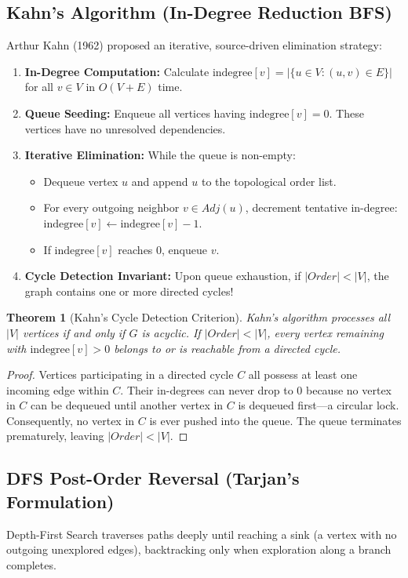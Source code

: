 \documentclass[10pt,journal,compsoc,onecolumn]{IEEEtran}
\newtheorem{theorem}{Theorem}
\begin{document}
\subsection{Kahn's Algorithm (In-Degree Reduction BFS)}
Arthur Kahn (1962) proposed an iterative, source-driven elimination strategy:
\begin{enumerate}
    \item \textbf{In-Degree Computation:} Calculate $\text{indegree}[v] = |\{u \in V : (u, v) \in E\}|$ for all $v \in V$ in $O(V + E)$ time.
    \item \textbf{Queue Seeding:} Enqueue all vertices having $\text{indegree}[v] = 0$. These vertices have no unresolved dependencies.
    \item \textbf{Iterative Elimination:} While the queue is non-empty:
    \begin{itemize}
        \item Dequeue vertex $u$ and append $u$ to the topological order list.
        \item For every outgoing neighbor $v \in Adj(u)$, decrement tentative in-degree: $\text{indegree}[v] \leftarrow \text{indegree}[v] - 1$.
        \item If $\text{indegree}[v]$ reaches $0$, enqueue $v$.
    \end{itemize}
    \item \textbf{Cycle Detection Invariant:} Upon queue exhaustion, if $|Order| < |V|$, the graph contains one or more directed cycles!
\end{enumerate}

\begin{theorem}[Kahn's Cycle Detection Criterion]
Kahn's algorithm processes all $|V|$ vertices if and only if $G$ is acyclic. If $|Order| < |V|$, every vertex remaining with $\text{indegree}[v] > 0$ belongs to or is reachable from a directed cycle.
\end{theorem}
\begin{proof}
Vertices participating in a directed cycle $C$ all possess at least one incoming edge within $C$. Their in-degrees can never drop to 0 because no vertex in $C$ can be dequeued until another vertex in $C$ is dequeued first—a circular lock. Consequently, no vertex in $C$ is ever pushed into the queue. The queue terminates prematurely, leaving $|Order| < |V|$.
\end{proof}

\subsection{DFS Post-Order Reversal (Tarjan's Formulation)}
Depth-First Search traverses paths deeply until reaching a sink (a vertex with no outgoing unexplored edges), backtracking only when exploration along a branch completes.
\end{document}
